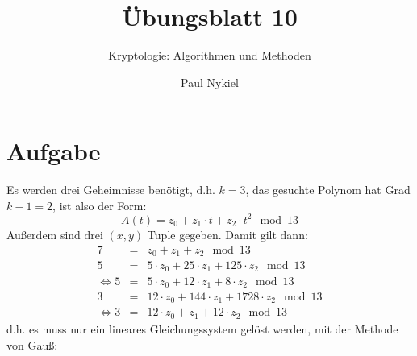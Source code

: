 \documentclass[DIN, pagenumber=false, fontsize=11pt, parskip=half]{scrartcl}
\title{Übungsblatt 10}
\subtitle{Kryptologie: Algorithmen und Methoden}
\author{Paul Nykiel}
\begin{document}
    \maketitle
    \section{Aufgabe}
    Es werden drei Geheimnisse benötigt, d.h. $k=3$, das gesuchte Polynom hat Grad $k-1=2$,
    ist also der Form:
    \begin{equation}
        A(t) = z_0 + z_1 \cdot t + z_2 \cdot t^2 \mod 13
    \end{equation}
    Außerdem sind drei $(x, y)$ Tuple gegeben. Damit gilt dann:
    \begin{eqnarray}
        7 &=& z_0 + z_1 + z_2 \mod 13 \\
        5 &=& 5 \cdot z_0 + 25 \cdot z_1 + 125 \cdot z_2 \mod 13 \\
        \Leftrightarrow 5 &=& 5 \cdot z_0 + 12 \cdot z_1 + 8 \cdot z_2 \mod 13 \\
        3 &=& 12 \cdot z_0 + 144 \cdot z_1 + 1728 \cdot z_2 \mod 13 \\
        \Leftrightarrow 3 &=& 12 \cdot z_0 + z_1 + 12 \cdot z_2 \mod 13 
    \end{eqnarray}
    d.h. es muss nur ein lineares Gleichungssystem gelöst werden, mit der
    Methode von Gauß:
\end{document}

